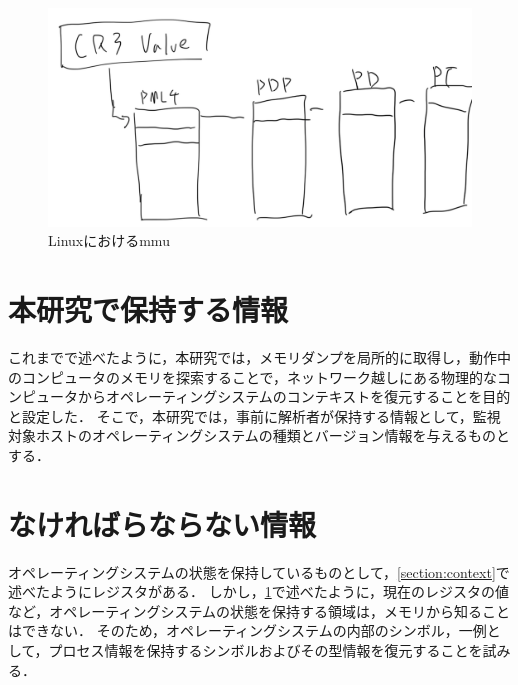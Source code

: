 \begin{figure}[htbp]
    \caption{Linuxにおけるmmu}
    \label{fig:mmu}
    \begin{center}
        \includegraphics[bb=0 0 1000 360,width=15cm]{img/tegaki/paging.png}
    \end{center}
\end{figure}

\section{本研究で保持する情報}
\label{section:info}

これまでで述べたように，本研究では，メモリダンプを局所的に取得し，動作中のコンピュータのメモリを探索することで，ネットワーク越しにある物理的なコンピュータからオペレーティングシステムのコンテキストを復元することを目的と設定した．
そこで，本研究では，事前に解析者が保持する情報として，監視対象ホストのオペレーティングシステムの種類とバージョン情報を与えるものとする．

\section{なければらならない情報}
\label{section:want}

オペレーティングシステムの状態を保持しているものとして，\ref{section:context}で述べたようにレジスタがある．
しかし，\ref{section:info}で述べたように，現在のレジスタの値など，オペレーティングシステムの状態を保持する領域は，メモリから知ることはできない．
そのため，オペレーティングシステムの内部のシンボル，一例として，プロセス情報を保持するシンボルおよびその型情報を復元することを試みる．
